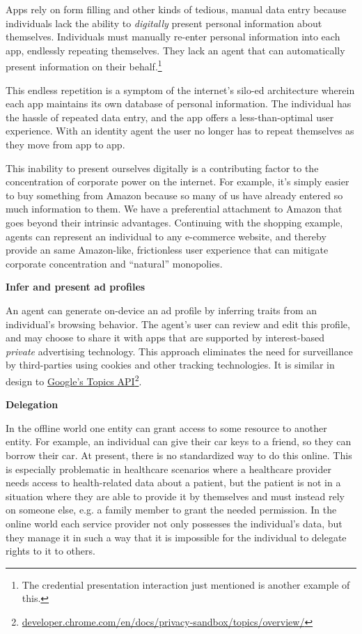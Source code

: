\documentclass[11pt, oneside]{article}   	%
\newcommand{\hyperfootnote}[1][]{\def\ArgI{{#1}}\hyperfootnoteRelay}
\newcommand\hyperfootnoteRelay[2][]{\href{#1#2}{\ArgI}\footnote{\href{#1#2}{#2}}}
\begin{document}
Apps rely on form filling and other kinds of tedious, manual data entry because individuals lack the ability to \emph{digitally} present personal information about themselves. Individuals must manually re-enter personal information into each app, endlessly repeating themselves. They lack an agent that can automatically present information on their behalf.\footnote{The credential presentation interaction just mentioned is another example of this.} 

This endless repetition is a symptom of the internet's silo-ed architecture wherein each app maintains its own database of personal information. The individual has the hassle of repeated data entry, and the app offers a less-than-optimal user experience. With an identity agent the user no longer has to repeat themselves as they move from app to app.

This inability to present ourselves digitally is a contributing factor to the concentration of corporate power on the internet. For example, it's simply easier to buy something from Amazon because so many of us have already entered so much information to them. We have a preferential attachment to Amazon that goes beyond their intrinsic advantages. Continuing with the shopping example, agents can represent an individual to any e-commerce website, and thereby provide an same Amazon-like, frictionless user experience that can mitigate corporate concentration and ``natural'' monopolies. 

\textbf{Infer and present ad profiles}

An agent can generate on-device an ad profile by inferring traits from an individual's browsing behavior. The agent's user can review and edit this profile, and may choose to share it with apps that are supported by interest-based \emph{private} advertising technology. This approach eliminates the need for surveillance by third-parties using cookies and other tracking technologies. It is similar in design to \hyperfootnote[Google's Topics API][https://]{developer.chrome.com/en/docs/privacy-sandbox/topics/overview/}.

\textbf{Delegation}

In the offline world one entity can grant access to some resource to another entity. For example, an individual can give their car keys to a friend, so they can borrow their car. At present, there is no standardized way to do this online. This is especially problematic in healthcare scenarios where a healthcare provider needs access to health-related data about a patient, but the patient is not in a situation where they are able to provide it by themselves and must instead rely on someone else, e.g. a family member to grant the needed permission. In the online world each service provider not only possesses the individual's data, but they manage it in such a way that it is impossible for the individual to delegate rights to it to others. 
\end{document}
